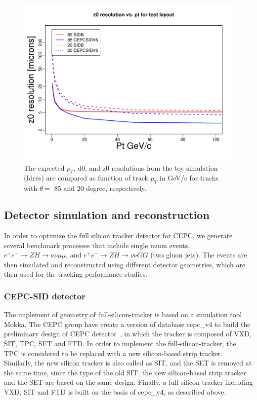 \begin{figure}[hbtp]
\begin{center}
\includegraphics[width=0.32\textheight,keepaspectratio]{Figures/TrackingSystem/FullSilicon/Overlay__z0vsptZ_R.pdf}
\caption{The expected $p_T$, d0, and z0 resolutions from the toy simulation (Idres) are compared as function of track $p_T$ in GeV/c
for tracks with $\theta =$ 85 and 20 degree, respectively. \label{fig:toyptd0z0}}
\end{center}
\end{figure}
   
\subsection{Detector simulation and reconstruction} 
In order to optimize the full silicon tracker detector for CEPC, we generate several benchmark processes that include single muon events, 
$e^+e^- \rightarrow ZH \rightarrow \nu\nu \mu\mu$, and $e^+e^- \rightarrow ZH \rightarrow \nu\nu GG$ (two gluon jets). 
The events are then simulated and reconstructed using 
different detector geometries, which are then used for the tracking performance studies.    

\subsubsection{CEPC-SID detector}
The implement of geometry of full-silicon-tracker is based on a simulation tool Mokka\cite{ilcMokka}. The CEPC group have create a version of 
database cepc\_v4 to build the preliminary design of CEPC detector~\cite{cepcILD}, in which the tracker is composed of VXD, SIT, TPC, SET and FTD. 
In order to implement the full-silicon-tracker, the TPC is considered to be replaced with a new silicon-based strip tracker. Similarly, the new 
silicon tracker is also called as SIT, and the SET is removed at the same time, since the type of the old SIT, the new silicon-based strip tracker 
and the SET are based on the same design. Finally, a full-silicon-tracker including VXD, SIT and FTD is built on the basis of cepc\_v4, as described 
above. 

